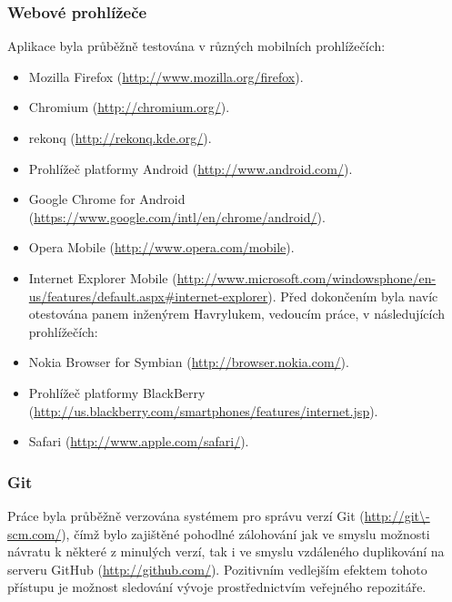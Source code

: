 \subsubsection{Webové prohlížeče}
Aplikace byla průběžně testována v různých mobilních prohlížečích:
\begin{itemize}
 \item Mozilla Firefox (\url{http://www.mozilla.org/firefox}).
 \item Chromium (\url{http://chromium.org/}).
 \item rekonq (\url{http://rekonq.kde.org/}).
 \item Prohlížeč platformy Android (\url{http://www.android.com/}).
 \item Google Chrome for Android (\url{https://www.google.com/intl/en/chrome/android/}).
 \item Opera Mobile (\url{http://www.opera.com/mobile}).
 \item Internet Explorer Mobile (\url{http://www.microsoft.com/windowsphone/en-us/features/default.aspx#internet-explorer}).
Před dokončením byla navíc otestována panem inženýrem Havrylukem, vedoucím práce, v následujících prohlížečích:
 \item Nokia Browser for Symbian  (\url{http://browser.nokia.com/}).
 \item Prohlížeč platformy BlackBerry (\url{http://us.blackberry.com/smartphones/features/internet.jsp}).
 \item Safari (\url{http://www.apple.com/safari/}).
\end{itemize}

\subsubsection{Git}
Práce byla průběžně verzována systémem pro správu verzí Git (\url{http://git\-scm.com/}), čímž bylo zajištěné pohodlné zálohování jak ve smyslu možnosti návratu k některé z minulých verzí, tak i ve smyslu vzdáleného duplikování na serveru GitHub (\url{http://github.com/}). Pozitivním vedlejším efektem tohoto přístupu je možnost sledování vývoje prostřednictvím veřejného repozitáře.